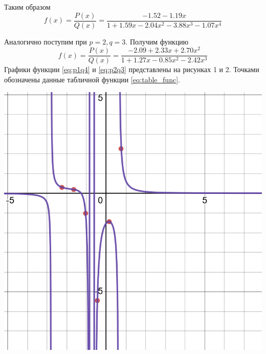 \documentclass[a4paper, fontsize=14pt]{article}
\begin{document}
Таким образом 
\begin{equation}
    \label{eq:p1q4}
    f(x) = \frac{P(x)}{Q(x)} = \frac{-1.52 -1.19x}{1 + 1.59x -2.04x^2 -3.88x^3 -1.07x^4}
\end{equation}

Аналогично поступим при $p = 2, q = 3$. Получим функцию
\begin{equation}
    \label{eq:p2q3}
    f(x) = \frac{P(x)}{Q(x)} = \frac{-2.09 +  2.33x + 2.70x^2}{1 +  1.27x -0.85x^2 -2.42x^3}
\end{equation}
Графики функции \eqref{eq:p1q4} и \eqref{eq:p2q3} представлены на рисунках 1 и 2. Точками обозначены данные табличной функции \eqref{eq:table_func}.

\begin{center}
    \label{p1q4}
        \includegraphics[scale=0.3]{src/p1q4}
\end{center}
\end{document}
